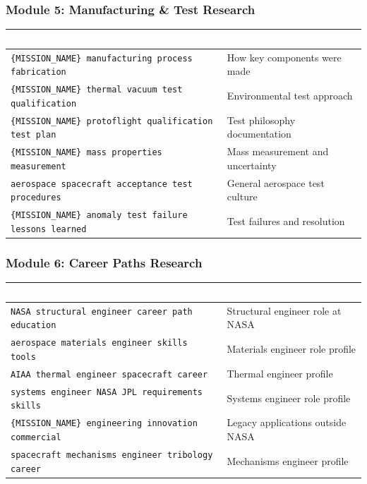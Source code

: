 \documentclass[11pt,letterpaper]{article}
\newcommand{\tableheader}[1]{\textbf{\sffamily\textcolor{white}{#1}}}
\begin{document}
\subsubsection{Module 5: Manufacturing \& Test Research}

\begin{center}
\begin{tabularx}{\textwidth}{L{4cm}X}
\toprule
{}
\tableheader{Query Template} & \tableheader{Target} \\
\midrule
\texttt{\{MISSION\_NAME\} manufacturing process fabrication} & How key components were made \\
\texttt{\{MISSION\_NAME\} thermal vacuum test qualification} & Environmental test approach \\
\texttt{\{MISSION\_NAME\} protoflight qualification test plan} & Test philosophy documentation \\
\texttt{\{MISSION\_NAME\} mass properties measurement} & Mass measurement and uncertainty \\
\texttt{aerospace spacecraft acceptance test procedures} & General aerospace test culture \\
\texttt{\{MISSION\_NAME\} anomaly test failure lessons learned} & Test failures and resolution \\
\bottomrule
\end{tabularx}
\end{center}

\subsubsection{Module 6: Career Paths Research}

\begin{center}
\begin{tabularx}{\textwidth}{L{4cm}X}
\toprule
{}
\tableheader{Query Template} & \tableheader{Target} \\
\midrule
\texttt{NASA structural engineer career path education} & Structural engineer role at NASA \\
\texttt{aerospace materials engineer skills tools} & Materials engineer role profile \\
\texttt{AIAA thermal engineer spacecraft career} & Thermal engineer profile \\
\texttt{systems engineer NASA JPL requirements skills} & Systems engineer role profile \\
\texttt{\{MISSION\_NAME\} engineering innovation commercial} & Legacy applications outside NASA \\
\texttt{spacecraft mechanisms engineer tribology career} & Mechanisms engineer profile \\
\bottomrule
\end{tabularx}
\end{center}
\end{document}
